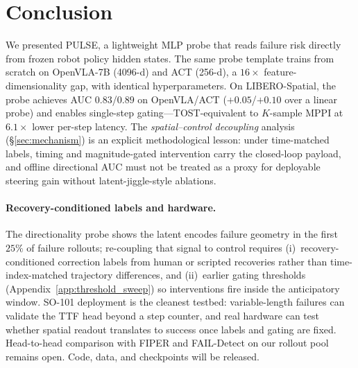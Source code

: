 \section{Conclusion}

We presented PULSE, a lightweight MLP probe that reads failure risk directly from frozen robot policy hidden states. The same probe template trains from scratch on OpenVLA-7B (4096-d) and ACT (256-d), a $16\times$ feature-dimensionality gap, with identical hyperparameters. On LIBERO-Spatial, the probe achieves AUC $0.83$/$0.89$ on OpenVLA/ACT ($+0.05$/$+0.10$ over a linear probe) and enables single-step gating---TOST-equivalent to $K$-sample MPPI at $6.1{\times}$ lower per-step latency. The \emph{spatial--control decoupling} analysis (\S\ref{sec:mechanism}) is an explicit methodological lesson: under time-matched labels, timing and magnitude-gated intervention carry the closed-loop payload, and offline directional AUC must not be treated as a proxy for deployable steering gain without latent-jiggle-style ablations.

\paragraph{Recovery-conditioned labels and hardware.}
The directionality probe shows the latent encodes failure geometry in the first $25\%$ of failure rollouts; re-coupling that signal to control requires (i)~recovery-conditioned correction labels from human or scripted recoveries rather than time-index-matched trajectory differences, and (ii)~earlier gating thresholds (Appendix~\ref{app:threshold_sweep}) so interventions fire inside the anticipatory window. SO-101 deployment is the cleanest testbed: variable-length failures can validate the TTF head beyond a step counter, and real hardware can test whether spatial readout translates to success once labels and gating are fixed. Head-to-head comparison with FIPER and FAIL-Detect on our rollout pool remains open. Code, data, and checkpoints will be released.
